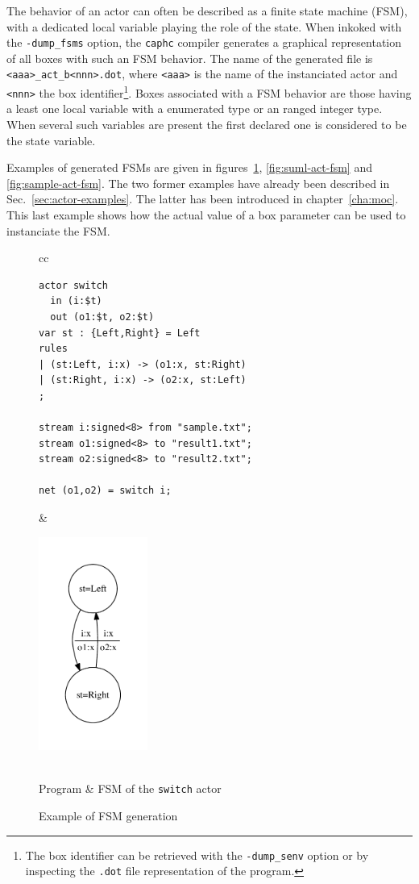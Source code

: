 The behavior of an actor can often be described as a finite state machine (FSM), with a dedicated
local variable playing the role of the state.
When inkoked with the \verb|-dump_fsms| option, the \verb|caphc| compiler generates a graphical
representation of all boxes with such an FSM behavior. The name of the generated file is
\verb|<aaa>_act_b<nnn>.dot|, where \verb|<aaa>| is the name of the instanciated actor and
\verb|<nnn>| the box identifier\footnote{The box identifier can be retrieved with the
  \texttt{-dump\_senv} option or by inspecting the \texttt{.dot} file representation of the
  program.}. Boxes associated with a FSM behavior are those having a least one local variable with a
enumerated type or an ranged integer type. When several such variables are present the first
declared one is considered to be the state variable.

\medskip
Examples of generated FSMs are given in figures~\ref{fig:switch-act-fsm}, \ref{fig:suml-act-fsm} and
\ref{fig:sample-act-fsm}. The two former examples have already been described in
Sec.~\ref{sec:actor-examples}. The latter has been introduced in chapter~\ref{cha:moc}. This last
example shows how the actual value of a box parameter can be used to instanciate the FSM.

\begin{figure}[h]
\begin{tabular}[c]{cc}
  \begin{minipage}[b]{0.5\linewidth}
    \begin{lstlisting}
actor switch
  in (i:$t)
  out (o1:$t, o2:$t)
var st : {Left,Right} = Left
rules
| (st:Left, i:x) -> (o1:x, st:Right)
| (st:Right, i:x) -> (o2:x, st:Left)
;

stream i:signed<8> from "sample.txt";
stream o1:signed<8> to "result1.txt";
stream o2:signed<8> to "result2.txt";

net (o1,o2) = switch i;
    \end{lstlisting} 
  \end{minipage} &
  \begin{minipage}[b]{0.5\linewidth}
  \includegraphics[height=7cm]{figs/switch-act-fsm}
  \end{minipage} \\
Program & FSM of the \texttt{switch} actor
\end{tabular}
  \caption{Example of FSM generation}
  \label{fig:switch-act-fsm}
\end{figure}

